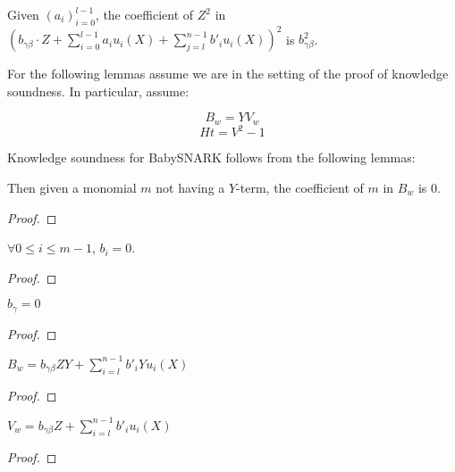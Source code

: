 \begin{lemma} \label{lem:B_sq_coeff}
\leanok
{}
Given $(a_i)_{i = 0}^{l - 1}$, the coefficient of $Z^2$ in $(b_{\gamma \beta} \cdot Z + \sum_{i = 0}^{l - 1} a_i u_i (X) + \sum_{j = l}^{n - 1} b'_i u_i (X))^2$ is $b_{\gamma \beta}^2$.
\end{lemma}
  
For the following lemmas assume we are in the setting of the proof of knowledge soundness. In particular, assume:

\begin{equation}
B_w = YV_w
\end{equation}
\begin{equation}
Ht = V^2 - 1  
\end{equation}

Knowledge soundness for BabySNARK follows from the following lemmas:

\begin{lemma}\label{lem:B_Y_coeff}
\leanok
{}
Then given a monomial $m$ not having a $Y$-term, the coefficient of $m$ in $B_w$ is 0.
\end{lemma}
\begin{proof}
\leanok
\end{proof}

\begin{lemma}\label{lem:b_i_zero}
\leanok
$\forall 0 \le i \le m - 1$, $b_i = 0$.
\end{lemma}
\begin{proof}
\leanok
\end{proof}

\begin{lemma}\label{lem:b_g_zero}
$b_{\gamma} = 0$
\end{lemma}
\begin{proof}
\leanok
\end{proof}

\begin{lemma}\label{lem:B_def}
\leanok
$B_w = b_{\gamma \beta} ZY + \sum_{i = l}^{n - 1} b'_i Y u_i(X) $
\end{lemma}
\begin{proof}
\leanok
{}
\end{proof}

\begin{lemma} \label{lem:V_def}
\leanok
$V_w = b_{\gamma \beta} Z + \sum_{i = l}^{n - 1} b'_i u_i(X) $
\end{lemma}
\begin{proof}
\leanok
{}
\end{proof}

